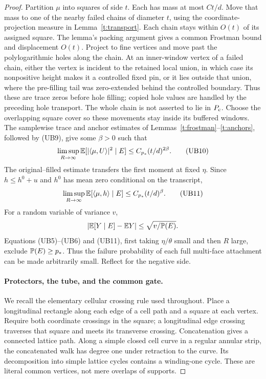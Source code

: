 \begin{proof}
Partition \(\mu\) into squares of side \(t\).  Each has mass at most
\(Ct/d\).  Move that mass to one of the nearby failed chains of
diameter \(t\), using the coordinate-projection measure in
Lemma~\ref{t:transport}.  Each chain stays within \(O(t)\) of its
assigned square.  The lemma's packing argument gives a common
Frostman bound and displacement \(O(t)\).  Project to fine vertices
and move past the polylogarithmic holes along the chain.
At an inner-window vertex of a failed chain, either the vertex is
incident to the retained local union, in which case its nonpositive
height makes it a controlled fixed pin, or it lies outside that union,
where the pre-filling tail was zero-extended behind the controlled
boundary.  Thus these are trace zeros before hole filling; copied
hole values are handled by the preceding hole transport.  The whole
chain is not asserted to lie in \(P_{\rm c}\).
Choose the overlapping square cover so these movements stay inside
its buffered windows.  The samplewise trace and anchor estimates
of Lemmas~\ref{t:frostman}--\ref{t:anchors}, followed by (UB9), give
some \(\beta>0\) such that
\[
 \limsup_{R\to\infty}\mathbb E[|\langle\mu,U\rangle|^2\mid E]
              \le C_{p_*}(t/d)^{2\beta}.                        \tag{UB10}
\]
The original--filled estimate transfers the first moment at fixed
\(\eta\).  Since \(h\le h^0+u\) and \(h^0\) has mean zero conditional
on the transcript,
\[
 \limsup_{R\to\infty}\mathbb E[\langle\mu,h\rangle\mid E]
              \le C_{p_*}(t/d)^\beta.                           \tag{UB11}
\]
For a random variable of variance \(v\),
\[
 |\mathbb E[Y\mid E]-\mathbb E Y|\le\sqrt{v/\mathbb P(E)}.
\]
Equations (UB5)--(UB6) and (UB11), first taking \(\eta/\theta\) small
and then \(R\) large, exclude \(\mathbb P(E)\ge p_*\).
Thus the failure probability of each full multi-face attachment can
be made arbitrarily small.  Reflect for the negative side.

\paragraph{Protectors, the tube, and the common gate.}
We recall the elementary cellular crossing rule used throughout.
Place a longitudinal rectangle along each edge of a cell path and
a square at each vertex.  Require both coordinate crossings in the
square; a longitudinal edge crossing traverses that square and meets
its transverse crossing.  Concatenation gives a connected lattice
path.  Along a simple closed cell curve in a regular annular strip,
the concatenated walk has degree one under retraction to the curve.
Its decomposition into simple lattice cycles contains a winding-one
cycle.  These are literal common vertices, not mere overlaps of supports.


\end{proof}
